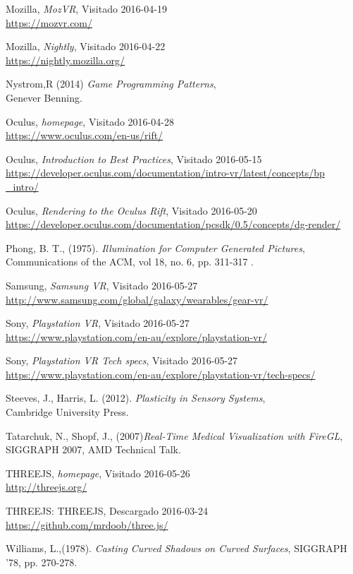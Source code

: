 \documentclass[12pt]{article}
\begin{document}
\begin{thebibliography}{9}
Mozilla, \textit{MozVR},
Visitado 2016-04-19
\\\url{https://mozvr.com/}

Mozilla, \textit{Nightly},
Visitado 2016-04-22
\\\url{https://nightly.mozilla.org/}

Nystrom,R (2014) \textit{Game Programming Patterns},\\
Genever Benning.

Oculus, \textit{homepage},
Visitado 2016-04-28
\\\url{https://www.oculus.com/en-us/rift/}

Oculus, \textit{Introduction to Best Practices},
Visitado 2016-05-15
\\\url{https://developer.oculus.com/documentation/intro-vr/latest/concepts/bp	
_intro/}

Oculus, \textit{Rendering to the Oculus Rift},
Visitado 2016-05-20
\\\url{https://developer.oculus.com/documentation/pcsdk/0.5/concepts/dg-render/}

Phong, B. T., (1975). \textit{Illumination for Computer Generated Pictures},\\
Communications of the ACM, vol 18, no. 6, pp. 311-317 .

Samsung, \textit{Samsung VR},
Visitado 2016-05-27
\\\url{http://www.samsung.com/global/galaxy/wearables/gear-vr/}

Sony, \textit{ Playstation VR},
Visitado 2016-05-27
\\\url{https://www.playstation.com/en-au/explore/playstation-vr/}

Sony, \textit{ Playstation VR Tech specs},
Visitado 2016-05-27
\\\url{https://www.playstation.com/en-au/explore/playstation-vr/tech-specs/}


Steeves, J., Harris, L. (2012). \textit{Plasticity in Sensory Systems},\\
Cambridge University Press.


Tatarchuk, N., Shopf, J., (2007)\textit{Real-Time Medical Visualization with FireGL},
SIGGRAPH 2007, AMD Technical Talk.

THREEJS, \textit{homepage},
Visitado 2016-05-26
\\\url{http://threejs.org/}

THREEJS: THREEJS,
Descargado 2016-03-24
\\\url{https://github.com/mrdoob/three.js/}

Williams, L.,(1978). \textit{Casting Curved Shadows on Curved Surfaces},
SIGGRAPH '78, pp. 270-278. 

\end{thebibliography}
\end{document}
